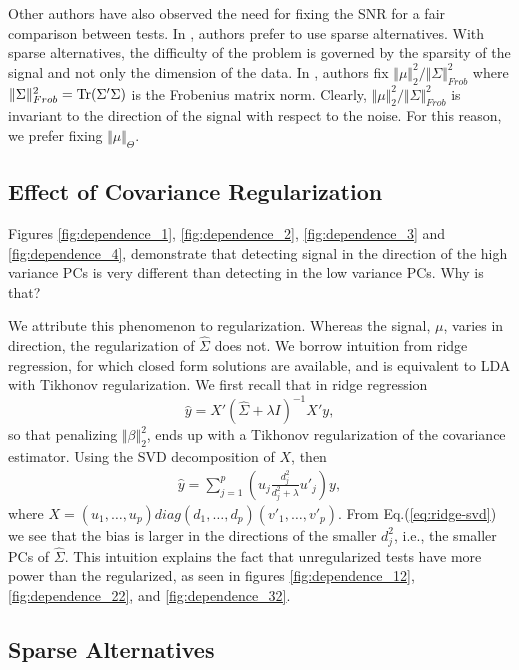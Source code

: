 \documentclass[]{bio}
\begin{document}
Other authors have also observed the need for fixing the SNR for a fair comparison between tests.
In \cite{ramdas2015decreasing}, authors prefer to use sparse alternatives.
With sparse alternatives, the difficulty of the problem is governed by the sparsity of the signal and not only the dimension of the data. 
In \cite{chen2010two}, authors fix $\Vert \mu \Vert_2^2/\Vert \Sigma \Vert^2_{Frob}$ where $\Vert \Sigma \Vert^2_{Frob}=\operatorname{Tr}(\Sigma'\Sigma)$ is the Frobenius matrix norm. 
Clearly, $\Vert \mu \Vert_2^2/\Vert \Sigma \Vert^2_{Frob}$ is invariant to the direction of the signal with respect to the noise. 
For this reason, we prefer fixing $\Vert \mu \Vert_\Theta$.






\subsection{Effect of Covariance Regularization}
Figures \ref{fig:dependence_1}, \ref{fig:dependence_2}, \ref{fig:dependence_3} and \ref{fig:dependence_4}, demonstrate that detecting signal in the direction of the high variance PCs is very different than detecting in the low variance PCs.
Why is that?

We attribute this phenomenon to regularization.
Whereas the signal, $\mu$, varies in direction, the regularization of $\hat \Sigma$ does not. 
We borrow intuition from ridge regression, for which closed form solutions are available, and is equivalent to LDA with Tikhonov regularization. 
We first recall that in ridge regression 
$$\hat y = X'(\hat \Sigma +\lambda I)^{-1}X'y,$$
so that penalizing $\Vert \beta \Vert_2^2$, ends up with a Tikhonov regularization of the covariance estimator.
Using the SVD decomposition of $X$, then 
\begin{align}
\label{eq:ridge-svd}
\hat y= \sum_{j=1}^p \left( u_j \frac{d_j^2}{d_j^2+\lambda}u'_j \right)y,
\end{align}
where
$X=(u_1,\dots,u_p)diag(d_1,\dots,d_p)(v'_1,\dots,v'_p)$.
From Eq.(\ref{eq:ridge-svd}) we see that the bias is larger in the directions of the smaller $d_j^2$, i.e., the smaller PCs of $\hat \Sigma$. 
This intuition explains the fact that unregularized tests have more power than the regularized, as seen in figures \ref{fig:dependence_12}, \ref{fig:dependence_22}, and \ref{fig:dependence_32}.


\subsection{Sparse Alternatives}
\label{sec:sparse}
\end{document}
